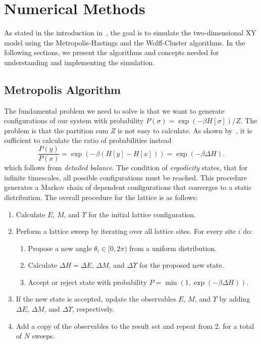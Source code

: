 \section{Numerical Methods}\label{sec:theo:numerical_methods}
	As stated in the introduction in~, the goal is to simulate the two-dimensional XY model using the Metropolis-Hastings and the Wolff-Cluster algorithms. In the following sections, we present the algorithms and concepts needed for understanding and implementing the simulation.

	\subsection{Metropolis Algorithm}\label{sec:theo:metropolis}
		The fundamental problem we need to solve is that we want to generate configurations of our system with probability $P(\sigma) = \exp{(-\beta H[\sigma])}/Z$. The problem is that the partition sum $Z$ is not easy to calculate. As shown by~\citet{metropolis}, it is sufficient to calculate the ratio of probabilities instead
		\begin{equation}
			\frac{P(y)}{P(x)} = \exp{(-\beta(H[y] - H[x]))} = \exp{(-\beta \Delta H)}.
		\end{equation}
		which follows from \emph{detailed balance}. The condition of \emph{ergodicity} states, that for infinite timescales, all possible configurations must be reached. This procedure generates a Markov chain of dependent configurations that converges to a static distribution. The overall procedure for the lattice is as follows:
		\begin{enumerate}
			\item Calculate $E$, $M$, and $\Upsilon$ for the initial lattice configuration.
			\item Perform a lattice sweep by iterating over all lattice sites. For every site $i$ do:
			\begin{enumerate}
				\item Propose a new angle $\theta_i \in [0,2\pi)$ from a uniform distribution.
				\item Calculate $\Delta H = \Delta E$, $\Delta M$, and $\Delta \Upsilon$ for the proposed new state.
				\item Accept or reject state with probability $P = \min{(1, \exp{(-\beta\Delta H)})}$.
			\end{enumerate}
			\item If the new state is accepted, update the observables $E$, $M$, and $\Upsilon$ by adding $\Delta E$, $\Delta M$, and $\Delta \Upsilon$, respectively.
			\item Add a copy of the observables to the result set and repeat from 2. for a total of $N$ sweeps.
		\end{enumerate}
		
